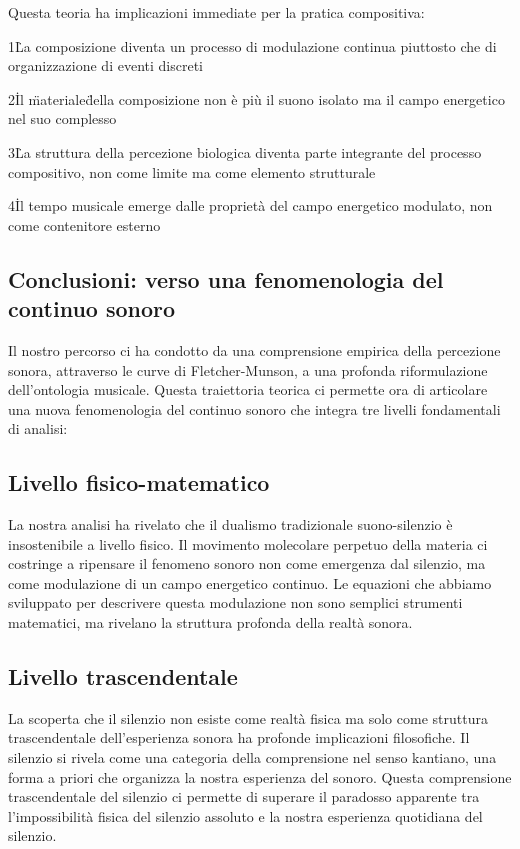 \documentclass[a4paper,11pt]{article}
\begin{document}
Questa teoria ha implicazioni immediate per la pratica compositiva:

1\. La composizione diventa un processo di modulazione continua
piuttosto che di organizzazione di eventi discreti

2\. Il \"materiale\" della composizione non è più il suono isolato ma il
campo energetico nel suo complesso

3\. La struttura della percezione biologica diventa parte integrante del
processo compositivo, non come limite ma come elemento strutturale

4\. Il tempo musicale emerge dalle proprietà del campo energetico
modulato, non come contenitore esterno

\subsection{Conclusioni: verso una fenomenologia del continuo sonoro}

Il nostro percorso ci ha condotto da una comprensione empirica della
percezione sonora, attraverso le curve di Fletcher-Munson, a una
profonda riformulazione dell'ontologia musicale. Questa traiettoria
teorica ci permette ora di articolare una nuova fenomenologia del
continuo sonoro che integra tre livelli fondamentali di analisi:

\subsection{Livello fisico-matematico}

La nostra analisi ha rivelato che il dualismo tradizionale
suono-silenzio è insostenibile a livello fisico. Il movimento molecolare
perpetuo della materia ci costringe a ripensare il fenomeno sonoro non
come emergenza dal silenzio, ma come modulazione di un campo energetico
continuo. Le equazioni che abbiamo sviluppato per descrivere questa
modulazione non sono semplici strumenti matematici, ma rivelano la
struttura profonda della realtà sonora.

\subsection{Livello trascendentale}

La scoperta che il silenzio non esiste come realtà fisica ma solo come
struttura trascendentale dell'esperienza sonora ha profonde implicazioni
filosofiche. Il silenzio si rivela come una categoria della comprensione
nel senso kantiano, una forma a priori che organizza la nostra
esperienza del sonoro. Questa comprensione trascendentale del silenzio
ci permette di superare il paradosso apparente tra l'impossibilità
fisica del silenzio assoluto e la nostra esperienza quotidiana del
silenzio.
\end{document}
